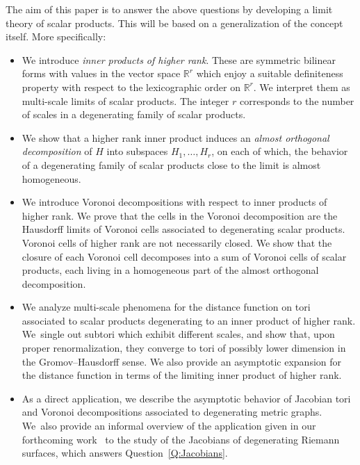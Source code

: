 \documentclass[AHL,Unicode,longabstracts]{cedram}
\newcommand{\R}{\mathbb{R}}
\begin{document}
The aim of this paper is to answer the above questions by developing a limit theory of scalar products. This will be based on a generalization of the concept itself. More specifically:
\begin{itemize}
\item We introduce \emph{inner products of higher rank}. These are symmetric bilinear forms with values in the vector space $\R^r$ which enjoy a suitable definiteness property with respect to the lexicographic order on $\R^r$. We interpret them as multi-scale limits of scalar products. The integer $r$ corresponds to the number of scales in a degenerating family of scalar products.

\item We show that a higher rank inner product induces an \emph{almost orthogonal decomposition} of $H$ into subspaces $H_1, \dots, H_r$, on each of which, the behavior of a degenerating family of scalar products close to the limit is almost homogeneous.

\item We introduce Voronoi decompositions with respect to inner products of higher rank. We prove that the cells in the Voronoi decomposition are the Hausdorff limits of Voronoi cells associated to degenerating scalar products. Voronoi cells of higher rank are not necessarily closed. We show that the closure of each Voronoi cell decomposes into a sum of Voronoi cells of scalar products, each living in a homogeneous part of the almost orthogonal decomposition.

\item We analyze multi-scale phenomena for the distance function on tori associated to scalar products degenerating to an inner product of higher rank. We~single out subtori which exhibit different scales, and show that, upon proper renormalization, they converge to tori of possibly lower dimension in the Gromov--Hausdorff sense. We also provide an asymptotic expansion for the distance function in terms of the limiting inner product of higher rank.


\item As a direct application, we describe the asymptotic behavior of Jacobian tori and Voronoi decompositions associated to degenerating metric graphs. We~also provide an informal overview of the application given in our forthcoming work~\cite{AN-AG-hybrid} to the study of the Jacobians of degenerating Riemann surfaces, which answers Question~\ref{Q:Jacobians}.
\end{itemize}
\end{document}
